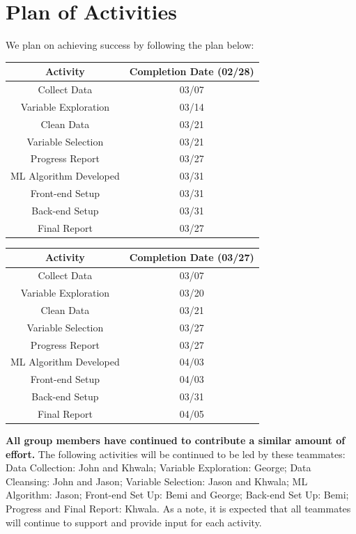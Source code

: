 \documentclass[sigconf,nonacm,11pt]{acmart}
\begin{document}
\section{Plan of Activities}

We plan on achieving success by following the plan below:\vspace{0.07em}
\begin{center}
    \begin{tabular}{||c|c||}
    \hline
    Activity & Completion Date (02/28)\\
    \hline\hline
    Collect Data & 03/07\\
    Variable Exploration & 03/14\\
    Clean Data & 03/21\\
    Variable Selection & 03/21\\
    Progress Report & 03/27\\
    ML Algorithm Developed & 03/31\\
    Front-end Setup & 03/31 \\
    Back-end Setup & 03/31 \\
    Final Report & 03/27\\
    \hline
    \end{tabular}
\end{center}

\begin{center}
    \begin{tabular}{||c|c||}
    \hline
    Activity & Completion Date (03/27)\\
    \hline\hline
    Collect Data & 03/07\\
    Variable Exploration & 03/20\\
    Clean Data & 03/21\\
    Variable Selection & 03/27\\
    Progress Report & 03/27\\
    ML Algorithm Developed & 04/03\\
    Front-end Setup & 04/03\\
    Back-end Setup & 03/31\\
    Final Report & 04/05\\
    \hline
    \end{tabular}
\end{center}

\textbf{All group members have continued to contribute a similar amount of effort.} The following activities will be continued to be led by these teammates: Data Collection: John and Khwala; Variable Exploration: George; Data Cleansing: John and Jason; Variable Selection: Jason and Khwala; ML Algorithm: Jason; Front-end Set Up: Bemi and George; Back-end Set Up: Bemi; Progress and Final Report: Khwala. As a note, it is expected that all teammates will continue to support and provide input for each activity.
\end{document}
